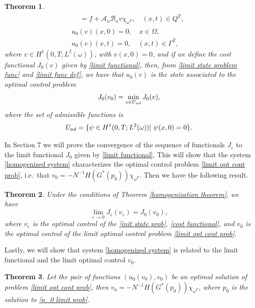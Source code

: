 \documentclass[10pt,a4paper]{amsart}
\numberwithin{equation}{section}
\newtheorem{theorem}{Theorem}[section]
\begin{document}
\begin{theorem}
\begin{equation}
\begin{gathered}
\begin{aligned}
&=f+\mathcal{A}_n\mathcal{B}_nv\chi _{\omega ^{T}}, \quad (x,t)\in Q^{T},
\end{aligned} \\
u_0(v)(x,0)=0, \quad x\in \Omega , \\
u_0(v)(x,t)=0, \quad (x,t)\in \Gamma ^{T},%
\end{gathered}   \label{limit state problem func}
\end{equation}
where $v\in H^{1}(0,T;L^2(\omega ))$, with $v(x,0)=0$, and if we define
the cost functional $J_0(v)$ given by \eqref{limit functional}, then,
from \eqref{limit state problem func} and \eqref{limit func def}, we have
that $u_0(v)$ is the state associated to the optimal control problem
\begin{equation}
J_0(v_0)=\min _{v\in U_{\rm ad}}J_0(v),  \label{limit opt cont prob}
\end{equation}
where the set of admissible functions is
\[
U_{\rm ad}=\{ \psi \in H^{1}(0,T;L^2(\omega ))|\text{ }\psi (x,0)=0\}.
\]
\end{theorem}


In Section 7 we will prove the convergence of the sequence of functionals 
$J_{\varepsilon }$ to the limit functional $J_0$ given by \eqref{limit functional}. 
This will show that the system \eqref{homogenized system} characterizes the optimal 
control problem \eqref{limit opt cont prob}, i.e.\
that $v_0=-N^{-1}H(G^{\ast }(p_0))\chi _{\omega ^{T}}$. 
Then we have the following result.

\begin{theorem}
\label{thm: cost func limit} 
Under the conditions of Theorem \ref{homogenization theorem}, we have
\[
\lim _{\varepsilon \to 0}J_{\varepsilon }(v_{\varepsilon
})=J_0(v_0),
\]%
where $v_{\varepsilon }$ is the optimal control of the
\eqref{init state prob}, \eqref{cost functional}, and $v_0$ is the optimal control
of the limit optimal control problem \eqref{limit opt cont prob}.
\end{theorem}

 Lastly, we will show that  system \eqref{homogenized system} is
related to the limit functional and the limit optimal control $v_0$.

\begin{theorem}
\label{Thm convergence controls}
Let the pair of functions $(u_0(v_0),v_0)$ be an optimal solution of 
problem \eqref{limit opt cont prob}, then 
$v_0=-N^{-1}H(G^{\ast }(p_0))\chi _{\omega ^{T}}$,
where $p_0$ is the solution to \eqref{p_0 limit prob}.
\end{theorem}
\end{document}
